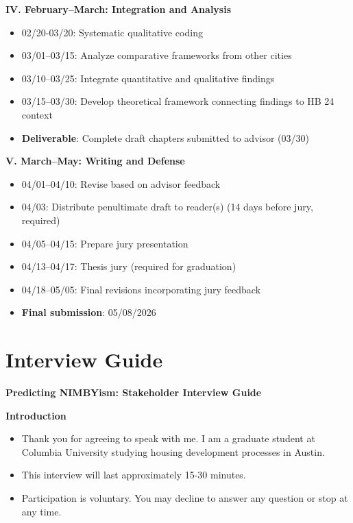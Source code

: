 \documentclass[12pt]{article}
\begin{document}
{\noindent\textbf{IV. February--March: Integration and Analysis}
\begin{itemize}[noitemsep,leftmargin=2em]
    \item 02/20-03/20: Systematic qualitative coding
    \item 03/01--03/15: Analyze comparative frameworks from other cities
    \item 03/10--03/25: Integrate quantitative and qualitative findings
    \item 03/15--03/30: Develop theoretical framework connecting findings to HB 24 context
    \item \textbf{Deliverable}: Complete draft chapters submitted to advisor (03/30)
\end{itemize}

\noindent\textbf{V. March--May: Writing and Defense}
\begin{itemize}[noitemsep,leftmargin=2em]
    \item 04/01--04/10: Revise based on advisor feedback
    \item 04/03: Distribute penultimate draft to reader(s) (14 days before jury, required)
    \item 04/05--04/15: Prepare jury presentation
    \item 04/13--04/17: Thesis jury (required for graduation)
    \item 04/18--05/05: Final revisions incorporating jury feedback
    \item \textbf{Final submission}: 05/08/2026
\end{itemize}
}

\printbibliography[title=References]

\appendix

\section{Interview Guide}

\textbf{Predicting NIMBYism: Stakeholder Interview Guide}

\textbf{Introduction}
\begin{itemize}[leftmargin=2em]
    \item Thank you for agreeing to speak with me. I am a graduate student at Columbia University studying housing development processes in Austin.
    \item This interview will last approximately 15-30 minutes.
    \item Participation is voluntary. You may decline to answer any question or stop at any time.
\end{itemize}
\end{document}
